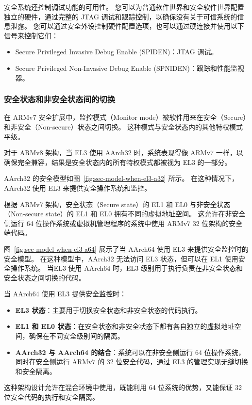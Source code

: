 安全系统还控制调试功能的可用性。
您可以为普通软件世界和安全软件世界配置独立的硬件，通过完整的 JTAG 调试和跟踪控制，以确保没有关于可信系统的信息泄露。
您可以通过安全外设控制硬件配置选项，也可以通过硬连接并使用以下信号来控制它们：

\begin{itemize}
\item
  Secure Privileged Invasive Debug Enable (SPIDEN)：JTAG 调试。
\item
  Secure Privileged Non-Invasive Debug Enable (SPNIDEN)：跟踪和性能监视器。
\end{itemize}

\subsubsection{安全状态和非安全状态间的切换}

在 ARMv7 安全扩展中，监控模式（Monitor mode）被软件用来在安全（Secure）和非安全（Non-secure）状态之间切换。
这种模式与安全状态内的其他特权模式平级。

对于 ARMv8 架构，当 EL3 使用 AArch32 时，系统表现得像 ARMv7 一样，以确保完全兼容，结果是安全状态内的所有特权模式都被视为 EL3 的一部分。

AArch32 的安全模型如图~\ref{fig:sec-model-when-el3-a32} 所示。
在这种情况下，AArch32 使用 EL3 来提供安全操作系统和监控。


根据 ARMv7 架构，安全状态（Secure state）的 EL1 和 EL0 与非安全状态（Non-secure state）的 EL1 和 EL0 拥有不同的虚拟地址空间。
这允许在非安全侧运行 64 位操作系统或虚拟机管理程序的系统中使用 ARMv7 32 位架构的安全端代码。

图~\ref{fig:sec-model-when-el3-a64} 展示了当 AArch64 使用 EL3 来提供安全监控时的安全模型。
在这种模型中，AArch32 无法访问 EL3 状态，但可以在 EL1 使用安全操作系统。
当EL3 使用 AArch64 时，EL3 级别用于执行负责在非安全状态和安全状态之间切换的代码。

当 AArch64 使用 EL3 提供安全监控时：
\begin{itemize}
\item
  \textbf{EL3 状态}：主要用于切换安全状态和非安全状态的代码执行。
\item
  \textbf{EL1 和 EL0 状态}：在安全状态和非安全状态下都有各自独立的虚拟地址空间，确保在不同安全级别间的隔离。
\item
  \textbf{AArch32 与 AArch64 的结合}：系统可以在非安全侧运行 64 位操作系统，同时在安全侧运行 ARMv7 的 32 位安全代码，通过 EL3 的管理实现无缝切换和安全隔离。
\end{itemize}

这种架构设计允许在混合环境中使用，既能利用 64 位系统的优势，又能保证 32 位安全代码的执行和安全隔离。

